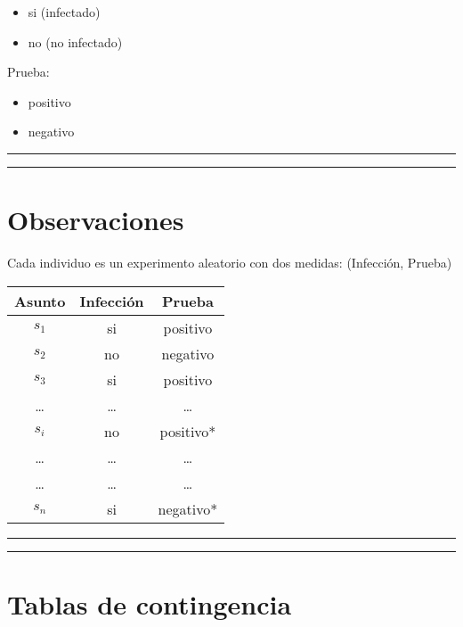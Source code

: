 \documentclass[
]{book}
\providecommand{\tightlist}{%
  \setlength{\itemsep}{0pt}\setlength{\parskip}{0pt}}
\begin{document}
\begin{itemize}
\tightlist
\item
  si (infectado)
\item
  no (no infectado)
\end{itemize}

Prueba:

\begin{itemize}
\tightlist
\item
  positivo
\item
  negativo
\end{itemize}

\begin{center}\rule{0.5\linewidth}{0.5pt}\end{center}

\begin{center}\rule{0.5\linewidth}{0.5pt}\end{center}

\hypertarget{observaciones}{%
\section{Observaciones}\label{observaciones}}

Cada individuo es un experimento aleatorio con dos medidas: (Infección, Prueba)

\begin{longtable}[]{@{}ccc@{}}
\toprule
Asunto & Infección & Prueba \\
\midrule
\endhead
\(s_1\) & si & positivo \\
\(s_2\) & no & negativo \\
\(s_3\) & si & positivo \\
\ldots{} & \ldots{} & \ldots{} \\
\(s_i\) & no & positivo* \\
\ldots{} & \ldots{} & \ldots{} \\
\ldots{} & \ldots{} & \ldots{} \\
\(s_n\) & si & negativo* \\
\bottomrule
\end{longtable}

\begin{center}\rule{0.5\linewidth}{0.5pt}\end{center}

\begin{center}\rule{0.5\linewidth}{0.5pt}\end{center}

\hypertarget{tablas-de-contingencia}{%
\section{Tablas de contingencia}\label{tablas-de-contingencia}}
\end{document}

